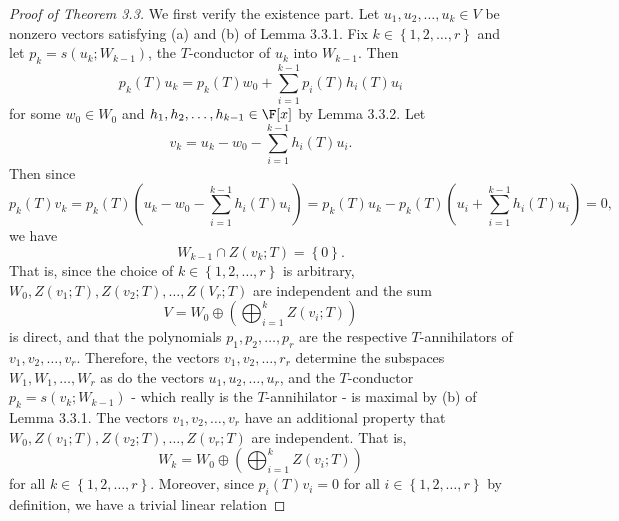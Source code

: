 \documentclass[linearalgebraII]{subfiles}
\begin{document}
    \begin{proof}[Proof of Theorem 3.3]
        We first verify the existence part. Let $u_1,u_2,\ldots,u_k\in V$ be nonzero vectors satisfying (a) and (b) of Lemma 3.3.1. Fix $k\in\left\lbrace 1,2,\ldots,r \right\rbrace $ and let $p_k=s\left( u_k;W_{k-1} \right) $, the $T$-conductor of $u_k$ into $W_{k-1}$. Then
        \begin{equation*}
            p_k(T)u_k = p_k(T)w_0 + \sum^{k-1}_{i=1} p_i(T)h_i(T)u_i
        \end{equation*}
        for some $w_0\in W_0$ and $h_1,h_2,\ldots,h_{k-1}\in\F[x]$ by Lemma 3.3.2. Let
        \begin{equation*}
            v_k = u_k - w_0 - \sum^{k-1}_{i=1} h_i(T)u_i.
        \end{equation*}
        Then since
        \begin{equation*}
            p_k(T)v_k = p_k(T)\left( u_k-w_0-\sum^{k-1}_{i=1} h_i(T)u_i \right) = p_k(T)u_k - p_k(T)\left( u_i+\sum^{k-1}_{i=1} h_i(T)u_i \right) = 0,
        \end{equation*}
        we have
        \begin{equation*}
            W_{k-1}\cap Z(v_k;T) = \left\lbrace 0 \right\rbrace .
        \end{equation*}
        That is, since the choice of $k\in\left\lbrace 1,2,\ldots,r \right\rbrace$ is arbitrary, $W_0, Z(v_1;T), Z(v_2;T), \ldots, Z(V_r;T)$ are independent and the sum
        \begin{equation*}
            V = W_0 \oplus \left( \bigoplus^{k}_{i=1} Z\left( v_i;T \right)  \right) 
        \end{equation*}
        is direct, and that the polynomials $p_1,p_2,\ldots,p_r$ are the respective $T$-annihilators of $v_1,v_2,\ldots,v_r$. Therefore, the vectors $v_1,v_2,\ldots,r_r$ determine the subspaces $W_1,W_1,\ldots,W_r$ as do the vectors $u_1,u_2,\ldots,u_r$, and the $T$-conductor $p_k = s\left( v_k;W_{k-1} \right)$ - which really is the $T$-annihilator - is maximal by (b) of Lemma 3.3.1. The vectors $v_1,v_2,\ldots,v_r$ have an additional property that $W_0,Z\left( v_1;T \right) ,Z\left( v_2;T \right), \ldots, Z\left( v_r;T \right) $ are independent. That is,
        \begin{equation*}
            W_k = W_0 \oplus \left( \bigoplus^{k}_{i=1} Z\left( v_i;T \right)  \right) 
        \end{equation*}
        for all $k\in \left\lbrace 1,2,\ldots,r \right\rbrace$. Moreover, since $p_i(T)v_i = 0$ for all $i\in \left\lbrace 1,2,\ldots,r \right\rbrace$ by definition, we have a trivial linear relation

\end{proof}
\end{document}
